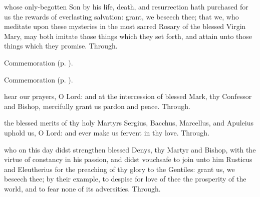 \collect
{} whose only-begotten Son by his life, death, and resurrection hath purchased for us the rewards of everlasting salvation: grant, we beseech thee; that we, who meditate upon these mysteries in the most sacred Rosary of the blessed Virgin Mary, may both imitate those things which they set forth, and attain unto those things which they promise. Through.
\begin{rubric}
	Commemoration  (p. \pageref{MarkRomeCollect}).
\end{rubric}

\begin{rubric}
	Commemoration  (p. \pageref{SergiusCollect}).
\end{rubric}


\clearpage
{}

\memorialCollect\label{MarkRomeCollect}
 hear our prayers, O Lord: and at the intercession of blessed Mark, thy Confessor and Bishop, mercifully grant us pardon and peace. Through.



\memorialCollect\label{SergiusCollect}
 the blessed merits of thy holy Martyrs Sergius, Bacchus, Marcellus, and Apuleius uphold us, O Lord: and ever make us fervent in thy love. Through.



\memorialCollect
{} who on this day didst strengthen blessed Denys, thy Martyr and Bishop, with the virtue of constancy in his passion, and didst vouchsafe to join unto him Rusticus and Eleutherius for the preaching of thy glory to the Gentiles: grant us, we beseech thee; by their example, to despise for love of thee the prosperity of the world, and to fear none of its adversities. Through.



